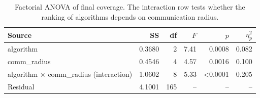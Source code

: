 \begin{table}[t]
\centering
\caption{Factorial ANOVA of final coverage. The interaction row tests whether the ranking of algorithms depends on communication radius.}
\label{tab:two-way}
\begin{tabular}{lrrrrr}
\toprule
Source & SS & df & $F$ & $p$ & $\eta^2_p$ \\
\midrule
algorithm & 0.3680 & 2 & 7.41 & 0.0008 & 0.082 \\
comm\_radius & 0.4546 & 4 & 4.57 & 0.0016 & 0.100 \\
algorithm $\times$ comm\_radius (interaction) & 1.0602 & 8 & 5.33 & <0.0001 & 0.205 \\
Residual & 4.1001 & 165 & -- & -- & -- \\
\bottomrule
\end{tabular}
\end{table}
